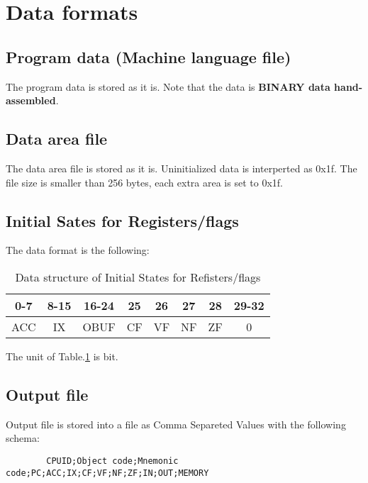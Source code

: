 \documentclass[a4paper]{article}
\begin{document}
    \section{Data formats}
        \subsection{Program data (Machine language file)}
        The program data is stored as it is. Note that the data is {\bf BINARY data hand-assembled}.
        
        \subsection{Data area file}
        The data area file is stored as it is. Uninitialized data is interperted as 0x1f. The file size is smaller than 256 bytes, each extra area is set to 0x1f.
        
        \subsection{Initial Sates for Registers/flags}
        The data format is the following:
        
        \begin{table}[htb]
                \begin{center}
                    \caption{Data structure of Initial States for Refisters/flags \label{structure}}
                    \begin{tabular}{|c|c|c|c|c|c|c|c|}
                        \hline0-7&8-15&16-24&25&26&27&28&29-32\\
                        \hline ACC&IX&OBUF&CF&VF&NF&ZF&0\\
                        \hline
                    \end{tabular}
                \end{center}
        \end{table}
        
        The unit of Table.\ref{structure} is bit.
        
        \subsection{Output file}
        Output file is stored into a file as Comma Separeted Values with the following schema:
        \begin{verbatim}
        CPUID;Object code;Mnemonic code;PC;ACC;IX;CF;VF;NF;ZF;IN;OUT;MEMORY
        \end{verbatim}
\end{document}
